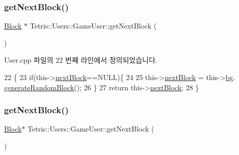 \subsubsection{\texorpdfstring{get\+Next\+Block()}{getNextBlock()}\hspace{0.1cm}{\footnotesize\ttfamily [1/2]}}
{\footnotesize\ttfamily \hyperlink{class_tetris_1_1_block}{Block} $\ast$ Tetris\+::\+Users\+::\+Game\+User\+::get\+Next\+Block (\begin{DoxyParamCaption}{ }\end{DoxyParamCaption})}



User.\+cpp 파일의 22 번째 라인에서 정의되었습니다.


\begin{DoxyCode}
22                                      \{
23                     \textcolor{keywordflow}{if}(this->\hyperlink{class_tetris_1_1_users_1_1_game_user_a49be97be588cd4b6438f06ec693787d5}{nextBlock}==NULL)\{
24                         
25                         this->\hyperlink{class_tetris_1_1_users_1_1_game_user_a49be97be588cd4b6438f06ec693787d5}{nextBlock} = this->\hyperlink{class_tetris_1_1_users_1_1_game_user_ad57a39d1716322764d92ff76f08ebcd5}{bg}.
      \hyperlink{class_tetris_1_1_block_generator_a10dfe1467d40437ad41c5ae76437ad78}{generateRandomBlock}();
26                     \}
27                     \textcolor{keywordflow}{return} this->\hyperlink{class_tetris_1_1_users_1_1_game_user_a49be97be588cd4b6438f06ec693787d5}{nextBlock};
28                 \}
\end{DoxyCode}
\mbox{\label{class_tetris_1_1_users_1_1_game_user_a9fdd8809e412f1d9a665c0cfb15af48d}} 
\subsubsection{\texorpdfstring{get\+Next\+Block()}{getNextBlock()}\hspace{0.1cm}{\footnotesize\ttfamily [2/2]}}
{\footnotesize\ttfamily \hyperlink{class_tetris_1_1_block}{Block}$\ast$ Tetris\+::\+Users\+::\+Game\+User\+::get\+Next\+Block (\begin{DoxyParamCaption}{ }\end{DoxyParamCaption})\hspace{0.3cm}{\ttfamily [inline]}}

